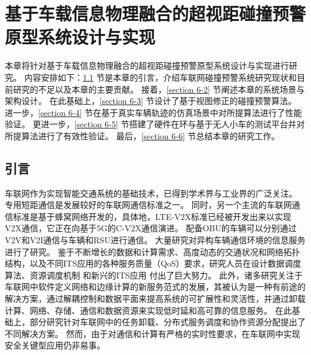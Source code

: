 \chapter{基于车载信息物理融合的超视距碰撞预警原型系统设计与实现}
本章将针对基于车载信息物理融合的超视距碰撞预警原型系统设计与实现进行研究。
内容安排如下：\ref{section 6-1} 节是本章的引言，介绍车联网碰撞预警系统研究现状和目前研究的不足以及本章的主要贡献。
接着，\ref{section 6-2} 节阐述本章的系统场景与架构设计。
在此基础上，\ref{section 6-3} 节设计了基于视图修正的碰撞预警算法。
进一步，\ref{section 6-4} 节在基于真实车辆轨迹的仿真场景中对所提算法进行了性能验证。
更进一步，\ref{section 6-5} 节搭建了硬件在环与基于无人小车的测试平台并对所提算法进行了有效性验证。
最后，\ref{section 6-6} 节总结本章的研究工作。

\section{引言}\label{section 6-1}

车联网作为实现智能交通系统的基础技术，已得到学术界与工业界的广泛关注。
专用短距通信\cite{kenney2011dedicated}是发展较好的车联网通信标准之一。
同时，另一个主流的车联网通信标准是基于蜂窝网络\cite{agiwal2016next}开发的，具体地，LTE-V2X标准已经被开发出来以实现V2X通信，它正在向基于5G的C-V2X通信演进。
配备OBU的车辆可以分别通过V2V和V2I通信与车辆和RSU进行通信。
大量研究\cite{ucar2015multihop, dai2018bandwidth, ahmed2018cooperative}对异构车辆通信环境的信息服务进行了研究。
鉴于不断增长的数据和计算需求\cite{zhai2018optimization}、高度动态的交通状况和网络拓扑结构\cite{zhai2019fast}，以及不同ITS应用的各种服务质量（QoS）要求\cite{babbar2022lbsmt}，研究人员在设计数据调度算法\cite{liu2016cooperative, dai2016adaptive, wang2017dynamic}、资源调度机制 \cite{peng2017resource, ahmed2018secure}和新兴的ITS应用 \cite{liu2013improving, dai2016quality}付出了巨大努力。
此外，诸多研究关注于车联网中软件定义网络\cite{liu2016cooperative, wang2019delay, liu2018coding}和边缘计算\cite{hou2016vehicular, wang2018offloading}的新服务范式的发展，其被认为是一种有前途的解决方案，通过解耦控制和数据平面来提高系统的可扩展性和灵活性，并通过卸载计算、网络、存储、通信和数据资源来实现低时延和高可靠的信息服务。
在此基础上，部分研究针对车联网中的任务卸载\cite{wang2019delay}、分布式服务调度\cite{sun2018cooperative}和协作资源分配\cite{zhou2019computation}提出了不同解决方案。
然而，由于对通信和计算有严格的实时性要求，在车联网中实现安全关键型应用仍非易事。

